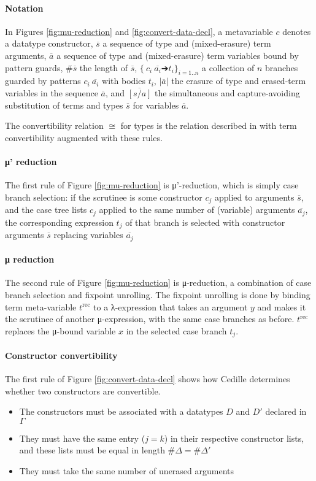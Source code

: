\documentclass{article}
\newcommand{\splab}[1]{\ensuremath{^{\text{#1}}}}
\newcommand{\vars}[1]{{\overline{#1}}}
\begin{document}
\paragraph{Notation}
In Figures \ref{fig:mu-reduction} and \ref{fig:convert-data-decl}, a metavariable $c$ denotes a datatype
constructor, $\vars{s}$ a sequence of type and (mixed-erasure) term arguments,
$\vars{a}$ a sequence of type and (mixed-erasure) term variables bound by
pattern guards, $\#\vars{s}$ the length of $\vars{s}$, \(\{\ c_i\ \vars{a_i} ➔
t_i\}_{i=1..n}\) a collection of $n$ branches guarded by patterns $c_i\
\vars{a_i}$ with bodies $t_i$, $|\vars{a}|$ the erasure of type and erased-term
variables in the sequence $\vars{a}$, and $\vars{[s/a]}$ the simultaneous and
capture-avoiding substitution of terms and types $\vars{s}$ for variables $\vars{a}$.

The convertibility relation $\cong$ for types is the relation described in 
\cite{St18_Cedille-Syntax-Semantics} with term convertibility augmented with these rules.

\paragraph{μ' reduction}
The first rule of Figure \ref{fig:mu-reduction} is μ'-reduction, which is simply case
branch selection: if the scrutinee is some constructor $c_j$ applied to
arguments $\vars{s}$, and the case tree lists $c_j$ applied to the same number of
(variable) arguments $\vars{a_j}$, the corresponding expression $t_j$ of that branch is
selected with constructor arguments $\vars{s}$ replacing variables $\vars{a_j}$

\paragraph{μ reduction}
The second rule of Figure \ref{fig:mu-reduction} is μ-reduction, a combination
of case branch selection and fixpoint unrolling. The fixpoint unrolling is done
by binding term meta-variable $t\splab{rec}$ to a λ-expression that takes an
argument $y$ and makes it the scrutinee of another μ-expression, with the same
case branches as before. $t\splab{rec}$ replaces the μ-bound variable $x$ in the
selected case branch $t_j$.

\paragraph{Constructor convertibility}
The first rule of Figure \ref{fig:convert-data-decl} shows how Cedille
determines whether two constructors are convertible.
\begin{itemize}
\item The constructors must be associated with a datatypes $D$ and $D'$ declared
  in $\Gamma$
\item They must have the same entry ($j = k$) in their respective constructor
  lists, and these lists must be equal in length $\#\Delta = \#\Delta'$
\item They must take the same number of unerased arguments
\end{itemize}
\end{document}
